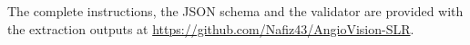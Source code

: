 The complete instructions, the JSON schema and the validator are provided with the extraction outputs at \url{https://github.com/Nafiz43/AngioVision-SLR}.







